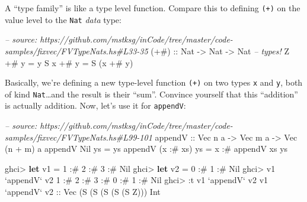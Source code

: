 \documentclass[]{article}
\newenvironment{Shaded}{}{}
\newcommand{\KeywordTok}[1]{\textcolor[rgb]{0.00,0.44,0.13}{\textbf{{#1}}}}
\newcommand{\DataTypeTok}[1]{\textcolor[rgb]{0.56,0.13,0.00}{{#1}}}
\newcommand{\DecValTok}[1]{\textcolor[rgb]{0.25,0.63,0.44}{{#1}}}
\newcommand{\CommentTok}[1]{\textcolor[rgb]{0.38,0.63,0.69}{\textit{{#1}}}}
\newcommand{\OtherTok}[1]{\textcolor[rgb]{0.00,0.44,0.13}{{#1}}}
\newcommand{\FunctionTok}[1]{\textcolor[rgb]{0.02,0.16,0.49}{{#1}}}
\newcommand{\NormalTok}[1]{{#1}}
\begin{document}
A ``type family'' is like a type level function. Compare this to
defining \texttt{(+)} on the value level to the \texttt{Nat} \emph{data}
type:

\begin{Shaded}
\begin{Highlighting}[]
\CommentTok{-- source: https://github.com/mstksg/inCode/tree/master/code-samples/fixvec/FVTypeNats.hs#L33-35}
\OtherTok{(+#) ::} \DataTypeTok{Nat} \OtherTok{->} \DataTypeTok{Nat} \OtherTok{->} \DataTypeTok{Nat}       \CommentTok{-- types!}
\DataTypeTok{Z}   \FunctionTok{+#} \NormalTok{y }\FunctionTok{=} \NormalTok{y}
\DataTypeTok{S} \NormalTok{x }\FunctionTok{+#} \NormalTok{y }\FunctionTok{=} \DataTypeTok{S} \NormalTok{(x }\FunctionTok{+#} \NormalTok{y)}
\end{Highlighting}
\end{Shaded}

Basically, we're defining a new type-level function \texttt{(+)} on two
types \texttt{x} and \texttt{y}, both of kind \texttt{Nat}\ldots{}and
the result is their ``sum''. Convince yourself that this ``addition'' is
actually addition. Now, let's use it for \texttt{appendV}:

\begin{Shaded}
\begin{Highlighting}[]
\CommentTok{-- source: https://github.com/mstksg/inCode/tree/master/code-samples/fixvec/FVTypeNats.hs#L99-101}
\OtherTok{appendV ::} \DataTypeTok{Vec} \NormalTok{n a }\OtherTok{->} \DataTypeTok{Vec} \NormalTok{m a }\OtherTok{->} \DataTypeTok{Vec} \NormalTok{(n }\FunctionTok{+} \NormalTok{m) a}
\NormalTok{appendV }\DataTypeTok{Nil}       \NormalTok{ys }\FunctionTok{=} \NormalTok{ys}
\NormalTok{appendV (x }\FunctionTok{:#} \NormalTok{xs) ys }\FunctionTok{=} \NormalTok{x }\FunctionTok{:#} \NormalTok{appendV xs ys}
\end{Highlighting}
\end{Shaded}

\begin{Shaded}
\begin{Highlighting}[]
\NormalTok{ghci}\FunctionTok{>} \KeywordTok{let} \NormalTok{v1 }\FunctionTok{=} \DecValTok{1} \FunctionTok{:#} \DecValTok{2} \FunctionTok{:#} \DecValTok{3} \FunctionTok{:#} \DataTypeTok{Nil}
\NormalTok{ghci}\FunctionTok{>} \KeywordTok{let} \NormalTok{v2 }\FunctionTok{=} \DecValTok{0} \FunctionTok{:#} \DecValTok{1} \FunctionTok{:#} \DataTypeTok{Nil}
\NormalTok{ghci}\FunctionTok{>} \NormalTok{v1 }\OtherTok{`appendV`} \NormalTok{v2}
\DecValTok{1} \FunctionTok{:#} \DecValTok{2} \FunctionTok{:#} \DecValTok{3} \FunctionTok{:#} \DecValTok{0} \FunctionTok{:#} \DecValTok{1} \FunctionTok{:#} \DataTypeTok{Nil}
\NormalTok{ghci}\FunctionTok{>} \FunctionTok{:}\NormalTok{t v1 }\OtherTok{`appendV`} \NormalTok{v2}
\NormalTok{v1 }\OtherTok{`appendV` v2 ::} \DataTypeTok{Vec} \NormalTok{(}\DataTypeTok{S} \NormalTok{(}\DataTypeTok{S} \NormalTok{(}\DataTypeTok{S} \NormalTok{(}\DataTypeTok{S} \NormalTok{(}\DataTypeTok{S} \DataTypeTok{Z}\NormalTok{))) }\DataTypeTok{Int}
\end{Highlighting}
\end{Shaded}
\end{document}

